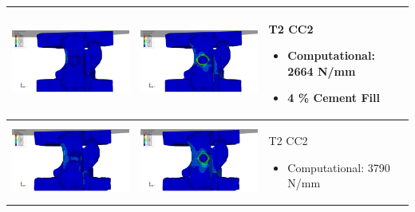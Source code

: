 \documentclass[11pt,a4paper]{article}
\begin{document}
\begin{landscape}
\begin{longtable}{|m{11cm}|m{11cm}|m{4cm}|}
\includegraphics[width=10cm]{images/T2_CC2_intact_MM_cement_Middle_ABAQUS_Stress.png}   & \includegraphics[width=10cm]{images/T2_CC2_intact_MM_cement_Middle_ABAQUS_Strain.png}   & T2 CC2 \begin{itemize} \item  Computational:	2664 N/mm \item 4 \% Cement Fill \end{itemize} \\ \hline 
\includegraphics[width=10cm]{images/T2_CC2_intact_MM_cement_Posterior_ABAQUS_Stress.png}   & \includegraphics[width=10cm]{images/T2_CC2_intact_MM_cement_Posterior_ABAQUS_Strain.png}   & T2 CC2 \begin{itemize} \item  Computational:	3790  N/mm \end{itemize} \\ \hline 

\end{longtable}
\end{landscape}
\end{document}
